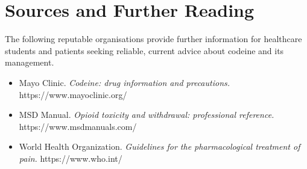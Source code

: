 \section*{Sources and Further Reading}
The following reputable organisations provide further information for healthcare students and patients seeking reliable, current advice about codeine and its management.

\begin{itemize}
    \item Mayo Clinic. \textit{Codeine: drug information and precautions.} https://www.mayoclinic.org/
    \item MSD Manual. \textit{Opioid toxicity and withdrawal: professional reference.} https://www.msdmanuals.com/
    \item World Health Organization. \textit{Guidelines for the pharmacological treatment of pain.} https://www.who.int/
\end{itemize}
